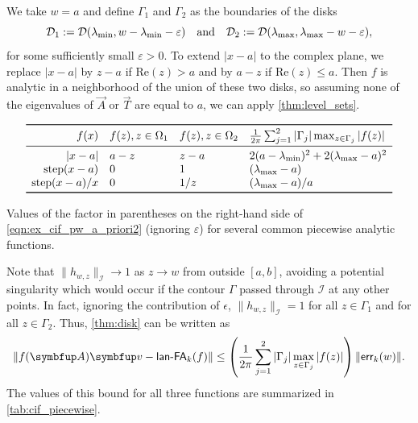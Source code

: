 We take \( w = a \) and define \( \Gamma_1 \) and \( \Gamma_2 \) as the boundaries of the disks 
\begin{equation*}
    \mathcal{D}_1 := \mathcal{D} ( \lambda_{\textup{min}}, w - \lambda_{\textup{min}} - \varepsilon) 
    \quad \text{and}\quad
    \mathcal{D}_2 := \mathcal{D} ( \lambda_{\textup{max}} , \lambda_{\textup{max}} - w - \varepsilon ),
\end{equation*}
for some sufficiently small \( \varepsilon > 0 \). 
To extend \( |x-a| \) to the complex plane, we replace \( |x-a| \) by \( z-a \) if \( \text{Re}(z) > a \) and by \( a-z \) if \( \text{Re}(z) \leq a \). 
Then \( f \) is analytic in a neighborhood of the union of these two disks, so assuming none of the eigenvalues of $\vec{A}$ or $\vec{T}$ are equal to $a$, we can apply \cref{thm:level_sets}.
\begin{table}[htb]
 \begin{align*}
\begin{array}{rlll}
    \toprule
    f(x) & f(z), z \in \Omega_1 & f(z), z \in \Omega_2 & \frac{1}{2 \pi} \sum_{j=1}^{2} | \Gamma_j | \max_{z\in\Gamma_j} | f(z) | \\\midrule
    |x-a| & a-z & z-a &  2(a- \lambda_{\text{min}} )^2 + 2(\lambda_{\text{max}}-a)^2  \\
    \operatorname{step}(x-a) & 0 & 1 &  (\lambda_{\text{max}}-a) \\
    \operatorname{step}(x-a)/x & 0 & 1/z & (\lambda_{\text{max}}-a)/a\\
    \bottomrule
\end{array}
\end{align*}
\caption{Values of the factor in parentheses on the right-hand side of \cref{eqn:ex_cif_pw_a_priori2} (ignoring $\varepsilon$) for several common piecewise analytic functions.}
\label{tab:cif_piecewise}
\end{table}


Note that \( \|h_{w,z}\|_{\mathcal{I}} \to 1 \) as \( z \to w \) from outside \( [a,b] \), avoiding a potential singularity which would occur if the contour $\Gamma$ passed through $\mathcal{I}$ at any other points.
In fact, ignoring the contribution of $\epsilon$, \( \| h_{w,z} \|_{\mathcal{I}} = 1 \) for all \( z\in \Gamma_1 \) and for all \( z\in\Gamma_2 \).
Thus, \cref{thm:disk} can be written as
\begin{equation}
    \| \fA \vec{v} - \lan_k(f) \|
    \leq \left(\frac{1}{2\pi} \sum_{j=1}^{2}  |\Gamma_j| \max_{z\in\Gamma_j} | f(z) | \right) \| \err_k(w) \| \label{eqn:ex_cif_pw_a_priori2}.
\end{equation}
The values of this bound for all three functions are summarized in \cref{tab:cif_piecewise}.

